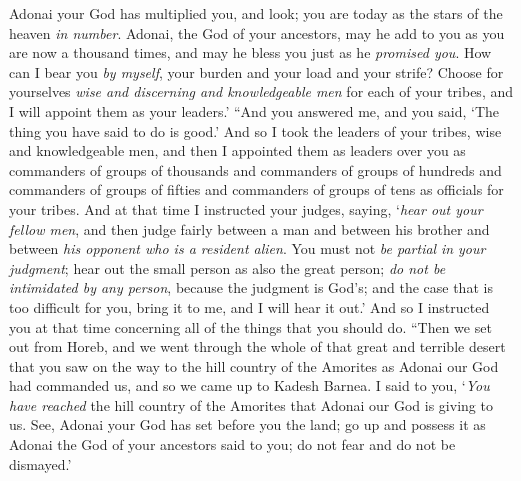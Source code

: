 \begin{biblechapter}
\verse Adonai your God has multiplied you, and look; you are today as the stars of the heaven \textit{in number}.
\verse Adonai, the God of your ancestors, may he add to you as you are now a thousand times, and may he bless you just as he \textit{promised you}.
\verse How can I bear you \textit{by myself}, your burden and your load and your strife?
\verse Choose for yourselves \textit{wise and discerning and knowledgeable men} for each of your tribes, and I will appoint them as your leaders.’
\verse “And you answered me, and you said, ‘The thing you have said to do is good.’
\verse And so I took the leaders of your tribes, wise and knowledgeable men, and then I appointed them as leaders over you as commanders of groups of thousands and commanders of groups of hundreds and commanders of groups of fifties and commanders of groups of tens as officials for your tribes.
\verse And at that time I instructed your judges, saying, ‘\textit{hear out your fellow men}, and then judge fairly between a man and between his brother and between \textit{his opponent who is a resident alien}.
\verse You must not \textit{be partial} \textit{in your judgment};  hear out the small person as also the great person; \textit{do not be intimidated by any person}, because the judgment is God’s; and the case that is too difficult for you, bring it to me, and I will hear it out.’
\verse And so I instructed you at that time concerning all of the things that you should do.
\verse “Then we set out from Horeb, and we went through the whole of that great and terrible desert that you saw on the way to the hill country of the Amorites as Adonai our God had commanded us, and so we came up to Kadesh Barnea.
\verse I said to you, ‘\textit{You have reached} the hill country of the Amorites that Adonai our God is giving to us.
\verse See, Adonai your God has set before you the land; go up and possess it as Adonai the God of your ancestors said to you; do not fear and do not be dismayed.’

\end{biblechapter}
